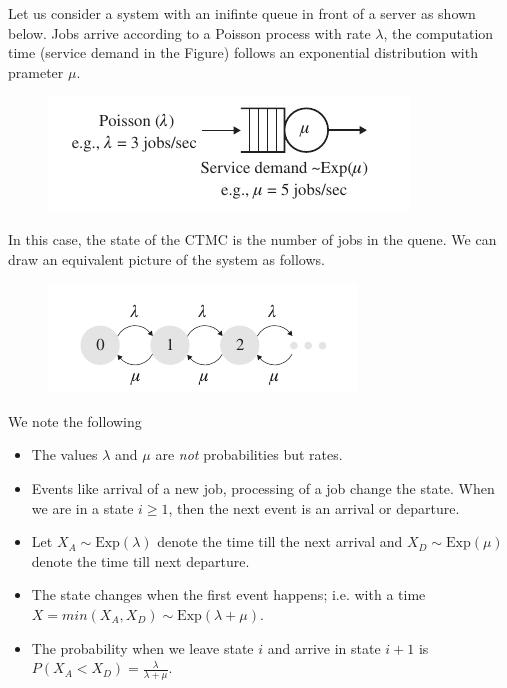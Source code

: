 Let us consider a system with an inifinte queue in front of a server as shown below. Jobs arrive according to a Poisson process with rate $\lambda$, the computation time (service demand in the Figure) follows an exponential distribution with prameter $\mu$.

\begin{figure}[hbt!]
\centering
\includegraphics[scale=0.75]{images/queuing_02_01.png}
\end{figure}


In this case, the state of the CTMC is the number of jobs in the quene. We can draw an equivalent picture of the system as follows.


\begin{figure}[hbt!]
\centering
\includegraphics[scale=0.75]{images/queuing_02_02.png}
\end{figure}


We note the following

\begin{itemize}

\item The values $\lambda$ and $\mu$ are \emph{not} probabilities but rates.

\item Events like arrival of a new job, processing of a job change the state. When we are in a state $i \geq 1$, then the next event is an arrival or departure.

\item Let $X_A \sim \text{Exp}(\lambda)$ denote the time till the next arrival and $X_D \sim \text{Exp}(\mu)$ denote the time till next departure.

\item The state changes when the first event happens; i.e. with a time $X = min(X_A, X_D) \sim \text{Exp}(\lambda + \mu)$.

\item The probability when we leave state $i$ and arrive in state $i+1$ is $P(X_A < X_D) = \frac{\lambda}{\lambda + \mu}$.

\end{itemize}


